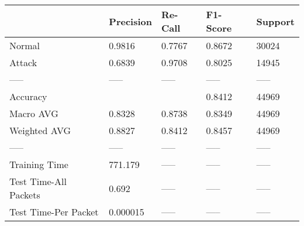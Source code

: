 \begin{tabular}{lllll}
\toprule
{} & Precision & Re-Call & F1-Score & Support \\
\midrule
Normal                &    0.9816 &  0.7767 &   0.8672 &   30024 \\
Attack                &    0.6839 &  0.9708 &   0.8025 &   14945 \\
-----                 &     ----- &   ----- &    ----- &   ----- \\
Accuracy              &           &         &   0.8412 &   44969 \\
Macro AVG             &    0.8328 &  0.8738 &   0.8349 &   44969 \\
Weighted AVG          &    0.8827 &  0.8412 &   0.8457 &   44969 \\
-----                 &     ----- &   ----- &    ----- &   ----- \\
Training Time         &   771.179 &   ----- &    ----- &   ----- \\
Test Time-All Packets &     0.692 &   ----- &    ----- &   ----- \\
Test Time-Per Packet  &  0.000015 &   ----- &    ----- &   ----- \\
\bottomrule
\end{tabular}
